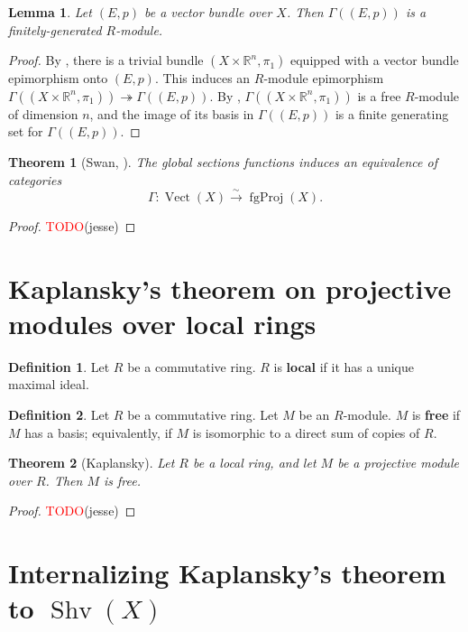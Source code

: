\documentclass[11pt]{article}
\newcommand{\R}{\mathbb{R}}
\newcommand{\remph}[1]{\textcolor{red}{#1}}
\newcommand{\TODO}{\remph{TODO}}
\newcommand{\Vect}{\operatorname{Vect}}
\newcommand{\fgProj}{\operatorname{fgProj}}
\newcommand{\Shv}{\operatorname{Shv}}
\theoremstyle{plain}
\newtheorem{lemma}{Lemma}[section]
\newtheorem{theorem}{Theorem}[section]
\theoremstyle{definition}
\newtheorem{definition}{Definition}[section]
\begin{document}
\begin{lemma}\label{lemma:global-sections-fg}
  Let \((E,p)\) be a vector bundle over \(X\). Then \(\Gamma((E,p))\) is a finitely-generated \(R\)-module.
\end{lemma}

\begin{proof}
  By , there is a trivial bundle \((X \times \R^n, \pi_1)\) equipped with a vector bundle epimorphism onto \((E,p)\). This induces an \(R\)-module epimorphism \(\Gamma((X \times \R^n, \pi_1)) \twoheadrightarrow \Gamma((E,p))\). By , \(\Gamma((X \times \R^n, \pi_1))\) is a free \(R\)-module of dimension \(n\), and the image of its basis in \(\Gamma((E,p))\) is a finite generating set for \(\Gamma((E,p))\).
\end{proof}

\begin{theorem}[Swan, \cite{swan1962vector}] \label{thm:swan}
  The global sections functions induces an equivalence of categories
  \[\Gamma : \Vect(X) \overset{\sim}{\longrightarrow} \fgProj(X).\]
\end{theorem}

\begin{proof}
  \TODO(jesse)
\end{proof}

\section{Kaplansky's theorem on projective modules over local rings}

\begin{definition}\label{def:local-ring}
  Let \(R\) be a commutative ring. \(R\) is \textbf{local} if it has a unique maximal ideal.
\end{definition}

\begin{definition}\label{def:free-module}
  Let \(R\) be a commutative ring. Let \(M\) be an \(R\)-module. \(M\) is \textbf{free} if \(M\) has a basis; equivalently, if \(M\) is isomorphic to a direct sum of copies of \(R\).
\end{definition}

\begin{theorem}[Kaplansky]\label{thm:kaplansky}
  Let \(R\) be a local ring, and let \(M\) be a projective module over \(R\). Then \(M\) is free.
\end{theorem}

\begin{proof}
  \TODO(jesse)
\end{proof}

\section{Internalizing Kaplansky's theorem to \(\Shv(X)\)}


\end{document}
